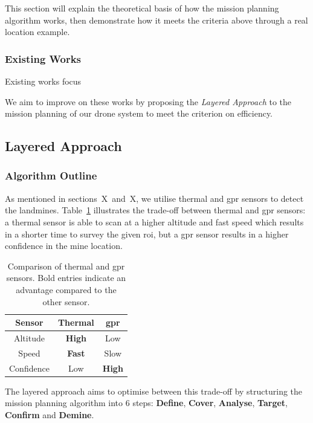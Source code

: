 This section will explain the theoretical basis of how the mission planning algorithm works, then demonstrate how it meets the criteria above through a real location example. 

\subsubsection{Existing Works}

Existing works focus 

We aim to improve on these works by proposing the \textit{Layered Approach} to the mission planning of our drone system to meet the criterion on efficiency. 

\subsection{Layered Approach}
\label{sec:msp_layered_approach}

\subsubsection{Algorithm Outline}

As mentioned in sections~X~and~X, we utilise thermal and \gls{gpr} sensors to detect the landmines. Table~\ref{tab:thermal_vs_gpr} illustrates the trade-off between thermal and \gls{gpr} sensors: a thermal sensor is able to scan at a higher altitude and fast speed which results in a shorter time to survey the given \gls{roi}, but a \gls{gpr} sensor results in a higher confidence in the mine location. 

\begin{table}
    \centering
    \begin{tabular}{|| c || c | c ||}
        \hline
        Sensor & Thermal & \gls{gpr} \\
        \hline\hline
        Altitude & \textbf{High} & Low \\
        \hline
        Speed & \textbf{Fast} & Slow \\
        \hline
        Confidence & Low & \textbf{High} \\
        \hline
    \end{tabular}
    \caption[Comparison of Thermal and \gls{gpr} Sensors]
    {Comparison of thermal and \gls{gpr} sensors. Bold entries indicate an advantage compared to the other sensor.}
    \label{tab:thermal_vs_gpr}
\end{table}

The layered approach aims to optimise between this trade-off by structuring the mission planning algorithm into 6 steps: \textbf{Define}, \textbf{Cover}, \textbf{Analyse}, \textbf{Target}, \textbf{Confirm} and \textbf{Demine}. 

